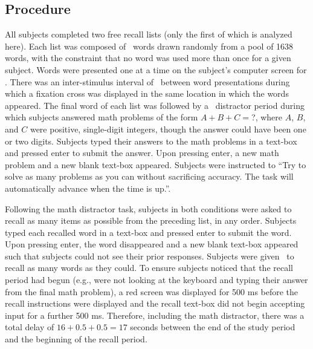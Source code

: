 \documentclass[jou,natbib]{apa6} %
\begin{document}
\subsection{Procedure}
All subjects completed two free recall lists (only the first of which is analyzed here). Each list was composed of \listlength~words drawn randomly from a pool of 1638 words, with the constraint that no word was used more than once for a given subject. Words were presented one at a time on the subject's computer screen for \presrate. 
There was an inter-stimulus interval of \isi~between word presentations during which a fixation cross was displayed in the same location in which the words appeared. The final word of each list was followed by a \DFRDelay~distractor period during which subjects answered math problems of the form $A+B+C=$?, where $A$, $B$, and $C$ were positive, single-digit integers, though the answer could have been one or two digits. Subjects typed their answers to the math problems in a text-box and pressed enter to submit the answer. Upon pressing enter, a new math problem and a new blank text-box appeared. Subjects were instructed to ``Try to solve as many problems as you can without sacrificing accuracy. The task will automatically advance when the time is up.''.

Following the math distractor task, subjects in both conditions were asked to recall as many items as possible from the preceding list, in any order. Subjects typed each recalled word in a text-box and pressed enter to submit the word. Upon pressing enter, the word disappeared and a new blank text-box appeared such that subjects could not see their prior responses. Subjects were given \recalltime~to recall as many words as they could. To ensure subjects noticed that the recall period had begun (e.g., were not looking at the keyboard and typing their answer from the final math problem), a red screen was displayed for 500 ms before the recall instructions were displayed and the recall text-box did not begin accepting input for a further 500 ms. Therefore, including the math distractor, there was a total delay of $16+0.5+0.5=17$ seconds between the end of the study period and the beginning of the recall period. 
\end{document}
